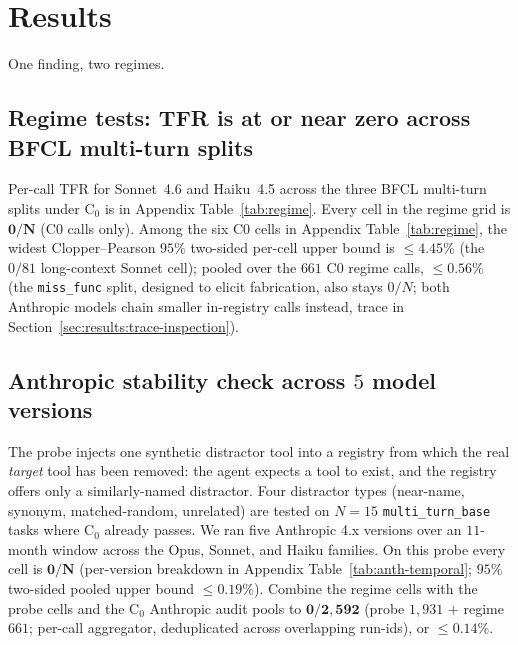 \section{Results}
\label{sec:results}

One finding, two regimes.

\subsection{Regime tests: TFR is at or near zero across BFCL multi-turn splits}
\label{sec:results:regime}

Per-call TFR for Sonnet~4.6 and Haiku~4.5 across the three BFCL
multi-turn splits under $\mathrm{C}_0$ is in Appendix Table~\ref{tab:regime}.
Every cell in the regime grid is $\boldsymbol{0/N}$ (C0 calls only).
Among the six C0 cells in Appendix Table~\ref{tab:regime}, the widest
Clopper--Pearson $95\%$ two-sided per-cell upper bound is $\leq\!4.45\%$
(the $0/81$ long-context Sonnet cell); pooled over the $661$ C0 regime
calls, $\leq\!0.56\%$ (the \texttt{miss\_func} split, designed to elicit
fabrication, also stays $0/N$; both Anthropic models chain smaller
in-registry calls instead, trace in Section~\ref{sec:results:trace-inspection}).

\subsection{Anthropic stability check across $5$ model versions}
\label{sec:results:probe}

The probe injects one synthetic distractor tool into a registry from
which the real \emph{target} tool has been removed: the agent expects a
tool to exist, and the registry offers only a similarly-named distractor.
Four distractor types (near-name, synonym, matched-random, unrelated) are
tested on $N\!=\!15$ \texttt{multi\_turn\_base} tasks where $\mathrm{C}_0$
already passes. We ran five Anthropic 4.x versions over an $11$-month window
across the Opus, Sonnet, and Haiku families. On this probe every cell
is $\boldsymbol{0/N}$ (per-version breakdown in Appendix
Table~\ref{tab:anth-temporal}; $95\%$ two-sided pooled upper bound
$\leq\!0.19\%$). Combine the regime cells
with the probe cells and the $\mathrm{C}_0$ Anthropic audit pools to
\textbf{$\boldsymbol{0/2{,}592}$} (probe $1{,}931$ $+$ regime $661$;
per-call aggregator, deduplicated across overlapping run-ids), or
$\leq\!0.14\%$.

